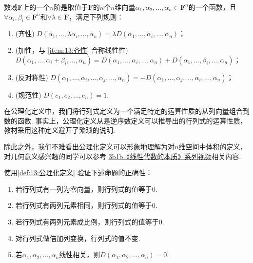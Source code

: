 \begin{definition} \label{def:13:公理化定义}
    数域$\mathbf{F}$上的一个$n$阶是取值于$\mathbf{F}$的$n$个$n$维向量$\alpha_1,\alpha_2,\ldots,\alpha_n \in \mathbf{F}^n$的一个函数，且$\forall \alpha_i,\beta_i \in \mathbf{F}^n$和$\forall \lambda \in \mathbf{F}$，满足下列规则：
    \begin{enumerate}
        \item \label{item:13:齐性}
              (齐性) $D(\alpha_1,\ldots,\lambda\alpha_i,\ldots,\alpha_n)=\lambda D(\alpha_1,\ldots,\alpha_i,\ldots,\alpha_n)$；

        \item \label{item:13:加性}
              (加性，与 \ref*{item:13:齐性} 合称线性性) \\
              $D(\alpha_1,\ldots,\alpha_i+\beta_i,\ldots,\alpha_n)=D(\alpha_1,\ldots,\alpha_i,\ldots,\alpha_n)+D(\alpha_1,\ldots,\beta_i,\ldots,\alpha_n)$；

        \item \label{item:13:反对称性}
              (反对称性) $D(\alpha_1,\ldots,\alpha_i,\ldots,\alpha_j,\ldots,\alpha_n)=-D(\alpha_1,\ldots,\alpha_j,\ldots,\alpha_i,\ldots,\alpha_n)$；

        \item \label{item:13:规范性}
              (规范性) $D(e_1,e_2,\ldots,e_n)=1$.
    \end{enumerate}
\end{definition}
在公理化定义中，我们将行列式定义为一个满足特定的运算性质的从列向量组合到数的函数. 事实上，公理化定义从是逆序数定义可以推导出的行列式的运算性质，教材采用这种定义避开了繁琐的说明.

除此之外，我们不难看出公理化定义可以形象地理解为对$n$维空间中体积的定义，对几何意义感兴趣的同学可以参考 \href{https://b23.tv/BV1ys411472E}{3b1b《线性代数的本质》系列视频}相关内容.
\begin{example} \label{ex:13:公理化定义}
    使用\autoref{def:13:公理化定义} 验证下述命题的正确性：
    \begin{enumerate}
        \item 若行列式有一列为零向量，则行列式的值等于0.

        \item 若行列式有两列元素相同，则行列式的值等于0.

        \item 若行列式有两列元素成比例，则行列式的值等于0.

        \item 对行列式做倍加列变换，行列式的值不变.

        \item 若$\alpha_1,\alpha_2,\ldots,\alpha_n$线性相关，则$D(\alpha_1,\alpha_2,\ldots,\alpha_n)=0$.
    \end{enumerate}
\end{example}

